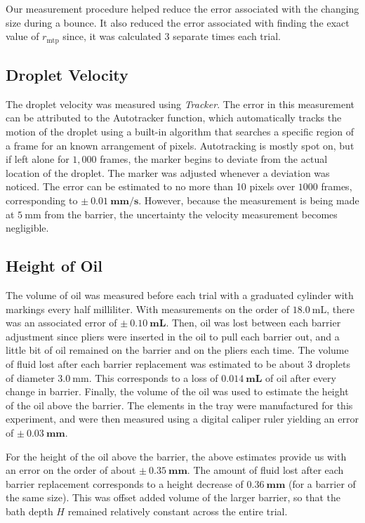 Our measurement procedure helped reduce the error associated with the changing size during a bounce. It also reduced the error associated with finding the exact value of $r_\mathrm{mtp}$ since, it was calculated 3 separate times each trial.

    \subsection{Droplet Velocity}
The droplet velocity was measured using \textit{Tracker}. The error in this measurement can be attributed to the Autotracker function, which automatically tracks the motion of the droplet using a built-in algorithm that searches a specific region of a frame for an known arrangement of pixels. Autotracking is mostly spot on, but if left alone for $1,000$ frames, the marker begins to deviate from the actual location of the droplet. The marker was adjusted whenever a deviation was noticed. The error can be estimated to no more than 10 pixels over $1000$ frames, corresponding to $\mathbf{\pm~0.01~\mathrm{\textbf{mm/s}}}$. However, because the measurement is being made at $5~\mathrm{mm}$ from the barrier, the uncertainty the velocity measurement becomes negligible.
    \subsection{Height of Oil}
The volume of oil was measured before each trial with a graduated cylinder with markings every half milliliter. With measurements on the order of $18.0~\mathrm{mL}$, there was an associated error of $\mathbf{\pm~0.10~\mathrm{\textbf{mL}}}$. Then, oil was lost between each barrier adjustment since pliers were inserted in the oil to pull each barrier out, and a little bit of oil remained on the barrier and on the pliers each time. The volume of fluid lost after each barrier replacement was estimated to be about 3 droplets of diameter $3.0~\mathrm{mm}$. This corresponds to a loss of $\mathbf{0.014~\mathrm{\textbf{mL}}}$ of oil after every change in barrier. Finally, the volume of the oil was used to estimate the height of the oil above the barrier. The elements in the tray were manufactured for this experiment, and were then measured using a digital caliper ruler yielding an error of $\mathbf{\pm~0.03~\mathrm{\textbf{mm}}}$. 

For the height of the oil above the barrier, the above estimates provide us with an error on the order of about $\mathbf{\pm~0.35~\mathrm{\textbf{mm}}}$. The amount of fluid lost after each barrier replacement corresponds to a height decrease of $\mathbf{0.36~\mathrm{\textbf{mm}}}$ (for a barrier of the same size). This was offset added volume of the larger barrier, so that the bath depth $H$ remained relatively constant across the entire trial. 


